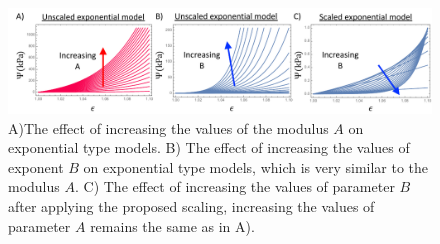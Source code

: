 \begin{figure}
\centering
\includegraphics[width=6.5in]{Figures/scalingapproach}
\caption{A)The effect of increasing the values of the modulus $A$ on exponential type models. B) The effect of increasing the values of exponent $B$ on exponential type models, which is very similar to the modulus $A$. C) The effect of increasing the values of parameter $B$ after applying the proposed scaling, increasing the values of parameter $A$ remains the same as in A).}
\label{fig:scalingapproach}
\end{figure}


